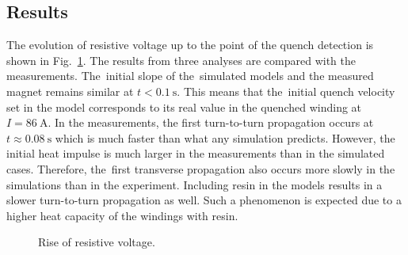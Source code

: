 \subsection{Results}

The evolution of resistive voltage up to the point of the quench detection is shown in Fig.~\ref{fig: quench_detection_v_res}. The results from three analyses are compared with the measurements. The~initial slope of the~simulated models and the measured magnet remains similar at $t < 0.1~\text{s}$. This means that the~initial quench velocity set in the model corresponds to its real value in the quenched winding at $I=86~\text{A}$. In the measurements, the first turn-to-turn propagation occurs at $t \approx 0.08~\text{s}$ which is much faster than what any simulation predicts. However, the initial heat impulse is much larger in the measurements than in the simulated cases. Therefore, the~first transverse propagation also occurs more slowly in the simulations than in the experiment. Including resin in the models results in a slower turn-to-turn propagation as well. Such a phenomenon is expected due to a higher heat capacity of the windings with resin. 

\begin{figure}[H]
    \centering
    \caption{Rise of resistive voltage.}
    \label{fig: quench_detection_v_res}
\end{figure}

